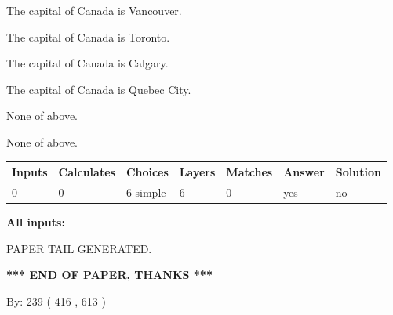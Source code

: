 \documentclass[12pt]{article}
\begin{document}
 
The capital of Canada is Vancouver.
 
 
The capital of Canada is Toronto.
 
 
The capital of Canada is Calgary.
 
 
The capital of Canada is Quebec City.
 
 
 None of above.
 
 
\noindent{}
 
 
 None of above.
 
 
\noindent{}
 
 
   
   
   
   
\noindent\begin{tabular}{|l|l|l|l|l|l|l|}
 \hline
Inputs & Calculates & Choices & Layers & Matches & Answer & Solution \\ \hline
 0  & 
 0  & 
 6
  simple  
  & 
 6  & 
 0  & 
  yes & 
  no 
  \\ \hline
 \end{tabular}
   
   
   
   
\noindent{}
   
   
   
   
\noindent\vspace{0.1in}\hspace{-0.08in} {\textbf{\Large{All inputs: }}}
   
   
   
   
   
   
 \vspace{0.2in}
 
   
   
\vspace{2.0in} PAPER TAIL GENERATED.
   
   
   
   
\vspace{1.0in} 
{\textbf{\large{ *** END OF PAPER, THANKS *** }}} 
   
   
\hspace{1.0in} By: 
 239 ( 416 ,  613 )
   
\end{document}
